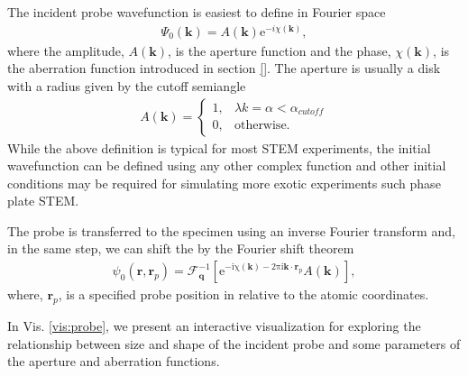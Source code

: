 \documentclass[%
 superscriptaddress,
 aip,
 amsmath,amssymb,
preprint,%
 author-year,%
longbibliography
]{revtex4-2}
\begin{document}
The incident probe wavefunction is easiest to define in Fourier space
\begin{align} \label{eq:fourier_probe}
    \Psi_0(\bm{k}) = A(\bm{k}) \mathrm{e}^{-i\chi(\bm{k})},
\end{align}
where the amplitude, $A(\bm{k})$, is the aperture function and the phase, $\chi(\bm{k})$, is the aberration function introduced in section \ref{}. The aperture is usually a disk with a radius given by the cutoff semiangle
\begin{align}
    A(\bm{k}) = 
    \begin{cases}
    1, &  \lambda k = \alpha < \alpha_{cutoff} \\
    0,              & \text{otherwise} .
    \end{cases}
\end{align}
While the above definition is typical for most STEM experiments, the initial wavefunction can be defined using any other complex function and other initial conditions may be required for simulating more exotic experiments such phase plate STEM.

The probe is transferred to the specimen using an inverse Fourier transform and, in the same step, we can shift the by the Fourier shift theorem
\begin{align} \label{eq:realspace_probe}
    \psi_0(\bm{r}, \bm{r}_p) = \mathcal{F}_{\bm{q}}^{-1} \left[\mathrm{e^{-i\chi(\bm{k}) - 2 \pi i \bm{k}\cdot \bm{r}_p }} A(\bm{k}) \right] ,
\end{align}
where, $\bm{r}_p$, is a specified probe position in relative to the atomic coordinates.

In Vis. \ref{vis:probe}, we present an interactive visualization for exploring the relationship between size and shape of the incident probe and some parameters of the aperture and aberration functions.
\end{document}

